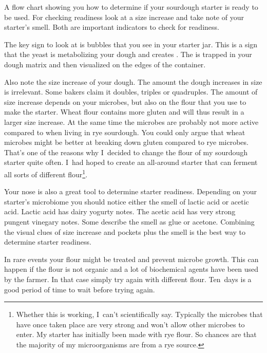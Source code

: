 \begin{flowchart}[!htb]
\centering
  
  \caption[Determining sourdough starter readiness]{A flow chart showing you how to
      determine if your sourdough starter is ready to be used.  For checking
      readiness look at a size increase and take note of your starter's smell.
      Both are important indicators to check for readiness.}%
  \label{fig:sourdough-starter-readiness}
\end{flowchart}

The key sign to look at is bubbles that you see in your starter
jar. This is a sign that the yeast is metabolizing your
dough and creates . The  is trapped in your dough
matrix and then visualized on the edges of the container.

Also note the size increase of your dough. The amount the dough increases
in size is irrelevant. Some bakers claim it doubles, triples or quadruples.
The amount of size increase depends on your microbes, but also on
the flour that you use to make the starter. Wheat flour contains
more gluten and will thus result in a larger size increase. At
the same time the microbes are probably not more active compared
to when living in rye sourdough. You could only argue that
wheat microbes might be better at breaking down gluten compared
to rye microbes. That's one of the reasons why I~decided to change
the flour of my sourdough starter quite often. I~had hoped to create
an all-around starter that can ferment all sorts of different
flour\footnote{Whether this is working, I~can't scientifically say.
Typically the microbes that have once taken place are very strong
and won't allow other microbes to enter. My starter has initially
been made with rye flour. So chances are that the majority of
my microorganisms are from a rye source.}.

Your nose is also
a great tool to determine starter readiness. Depending on
your starter's microbiome you should notice either the smell
of lactic acid or acetic acid. Lactic acid has dairy yogurty notes.
The acetic acid has very strong pungent vinegary notes. Some
describe the smell as glue or acetone. Combining the visual clues
of size increase and pockets plus the smell is the best way
to determine starter readiness.

In rare events your flour might be treated and prevent microbe growth.
This can happen if the flour is not organic and a lot of biochemical
agents have been used by the farmer. In that case simply try again
with different flour. Ten~days is a good period of time to wait before
trying again.

